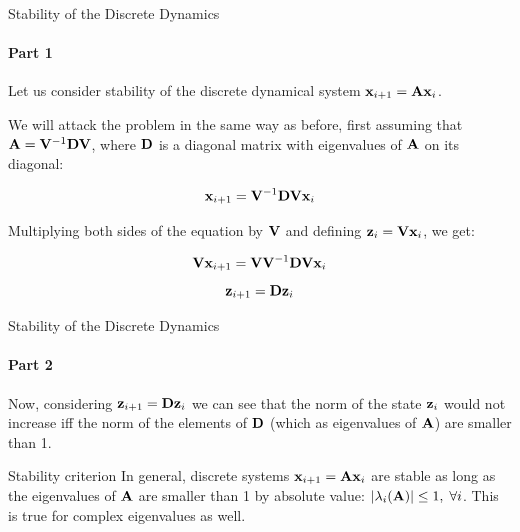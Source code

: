 \documentclass{beamer}
\begin{document}
\begin{frame}{Stability of the Discrete Dynamics}
\framesubtitle{Part 1}
\begin{flushleft}

Let us consider stability of the discrete dynamical system $\mathbf{x}_{i+1} = \mathbf{A}\mathbf{x}_i$.

\bigskip

We will attack the problem in the same way as before, first assuming that $\mathbf{A} = \mathbf{V}^{-1} \mathbf{D} \mathbf{V}$, where $\mathbf{D}$ is a diagonal matrix with eigenvalues of $\mathbf{A}$ on its diagonal:

\begin{equation}
    \mathbf{x}_{i+1} = \mathbf{V}^{-1} \mathbf{D} \mathbf{V}\mathbf{x}_i
\end{equation}

Multiplying both sides of the equation by $\mathbf{V}$ and defining $\mathbf{z}_i = \mathbf{V}\mathbf{x}_i$, we get:

\begin{equation}
    \mathbf{V}\mathbf{x}_{i+1} = \mathbf{V}\mathbf{V}^{-1} \mathbf{D} \mathbf{V}\mathbf{x}_i
\end{equation}
\begin{equation}
    \mathbf{z}_{i+1} = \mathbf{D} \mathbf{z}_i
\end{equation}


\end{flushleft}
\end{frame}


\begin{frame}{Stability of the Discrete Dynamics}
\framesubtitle{Part 2}
\begin{flushleft}

Now, considering $\mathbf{z}_{i+1} = \mathbf{D} \mathbf{z}_i$ we can see that the norm of the state $\mathbf{z}_i$ would not increase iff the norm of the elements of $\mathbf{D}$ (which as eigenvalues of $\mathbf{A}$) are smaller than 1.

\bigskip

\begin{block}{Stability criterion}
In general, discrete systems $\mathbf{x}_{i+1} = \mathbf{A}\mathbf{x}_i$ are stable as long as the eigenvalues of $\mathbf{A}$ are smaller than 1 by absolute value: $|\lambda_i(\mathbf{A})| \leq 1, \; \forall i$. This is true for complex eigenvalues as well.
\end{block}


\end{flushleft}
\end{frame}
\end{document}
